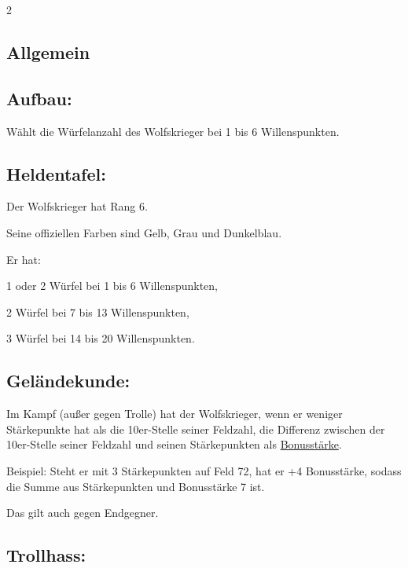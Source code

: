 \documentclass[10pt, a4paper, oneside]{book}
\begin{document}
\begin{multicols*}{2}\raggedcolumns



\begin{nobgcolor}

\section{Allgemein}

\subsection{Aufbau:}

Wählt die Würfelanzahl des Wolfskrieger bei 1 bis 6 Willenspunkten.


\subsection{Heldentafel:}

Der Wolfskrieger hat Rang 6.

Seine offiziellen Farben sind Gelb, Grau und Dunkelblau.

Er hat:

\bullet{} 1 oder 2 Würfel bei 1 bis 6 Willenspunkten,

\bullet{} 2 Würfel bei 7 bis 13 Willenspunkten,

\bullet{} 3 Würfel bei 14 bis 20 Willenspunkten.






\subsection{Geländekunde:}

Im Kampf (außer gegen Trolle) hat der Wolfskrieger, wenn er weniger Stärkepunkte hat als die 10er-Stelle seiner Feldzahl, die Differenz zwischen der 10er-Stelle seiner Feldzahl und seinen Stärkepunkten als \hyperref[bonusstaerke]{Bonusstärke}.

Beispiel: Steht er mit 3 Stärkepunkten auf Feld 72, hat er +4 Bonusstärke, sodass die Summe aus Stärkepunkten und Bonusstärke 7 ist.

Das gilt auch gegen Endgegner.



\subsection{Trollhass:}


\end{nobgcolor}
\end{multicols*}
\end{document}

